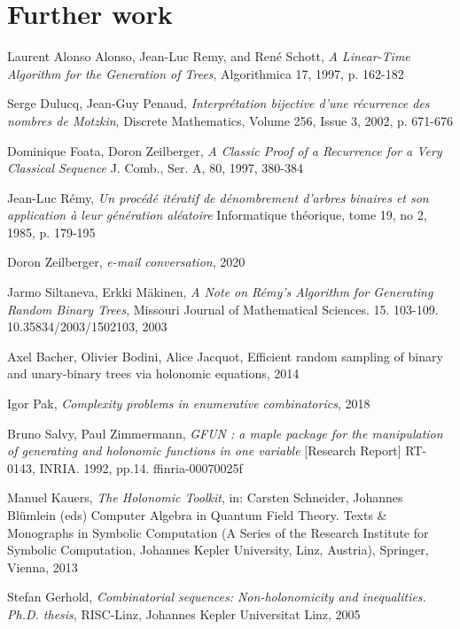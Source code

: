 \documentclass[final]{article}
\theoremstyle{definition}
\theoremstyle{remark}
\begin{document}
\section{Further work}%
\label{sec:further_work}


\clearpage

\begin{thebibliography}{9}
    Laurent Alonso Alonso, Jean-Luc Remy, and René Schott,
    \textit{A Linear-Time Algorithm for the Generation of Trees},
    Algorithmica 17,
    1997,
    p. 162-182

    Serge Dulucq, Jean-Guy Penaud,
    \textit{Interprétation bijective d'une récurrence des nombres de Motzkin},
    Discrete Mathematics,
    Volume 256, Issue 3,
    2002,
    p. 671-676

    Dominique Foata, Doron Zeilberger,
    \textit{A Classic Proof of a Recurrence for a Very Classical Sequence}
    J. Comb., Ser. A, 80,
    1997, 380-384

    Jean-Luc Rémy,
    \textit{Un procédé itératif de dénombrement d’arbres binaires et son application à leur génération aléatoire}
    Informatique théorique, tome 19, no 2, 
    1985,
    p. 179-195

    Doron Zeilberger,
    \textit{e-mail conversation},
    2020

    Jarmo Siltaneva, Erkki Mäkinen,
    \textit{A Note on Rémy's Algorithm for Generating Random Binary Trees},
    Missouri Journal of Mathematical Sciences. 15. 103-109. 10.35834/2003/1502103,
    2003 

    Axel Bacher, Olivier Bodini, Alice Jacquot,
    Efficient random sampling of binary and unary-binary trees via holonomic equations,
    2014

    Igor Pak,
    \textit{Complexity problems in enumerative combinatorics},
    2018

    Bruno Salvy, Paul Zimmermann,
    \textit{GFUN : a maple package for the manipulation of generating and holonomic functions in one variable}
    [Research Report] RT-0143, INRIA. 1992, pp.14. ffinria-00070025f

    Manuel Kauers,
    \textit{The Holonomic Toolkit},
    in: Carsten Schneider, Johannes Blümlein (eds) Computer Algebra in Quantum Field Theory. Texts \& Monographs in Symbolic Computation (A Series of the Research Institute for Symbolic Computation, Johannes Kepler University, Linz, Austria),
    Springer, Vienna,
    2013

    Stefan Gerhold,
    \textit{Combinatorial sequences: Non-holonomicity and inequalities. Ph.D. thesis},
    RISC-Linz, Johannes Kepler Universitat Linz,
    2005

\end{thebibliography}
\end{document}
